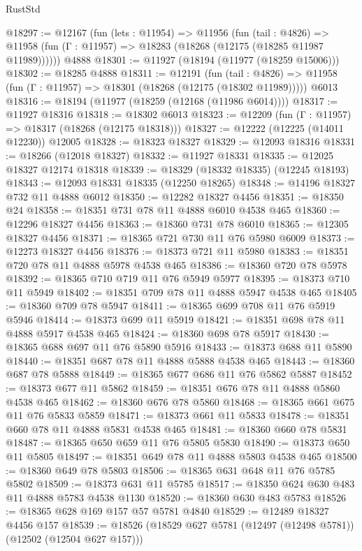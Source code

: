 \begin{lexlean}{RustStd}
\begin{coremodule}
@18297 := @12167
    (fun (lets : @11954) =>
    @11956
      (fun (tail : @4826) =>
      @11958 (fun (Γ : @11957) => @18283 (@18268 (@12175 (@18285 @11987 @11989))))))
    @4888
@18301 := @11927 (@18194 (@11977 (@18259 @15006)))
@18302 := @18285 @4888
@18311 := @12191
    (fun (tail : @4826) => @11958 (fun (Γ : @11957) => @18301 (@18268 (@12175 (@18302 @11989)))))
    @6013
@18316 := @18194 (@11977 (@18259 (@12168 (@11986 @6014))))
@18317 := @11927 @18316
@18318 := @18302 @6013
@18323 := @12209 (fun (Γ : @11957) => @18317 (@18268 (@12175 @18318)))
@18327 := @12222 (@12225 (@14011 @12230)) @12005
@18328 := @18323 @18327
@18329 := @12093 @18316
@18331 := @18266 (@12018 @18327)
@18332 := @11927 @18331
@18335 := @12025 @18327 @12174 @18318
@18339 := @18329 (@18332 @18335) (@12245 @18193)
@18343 := @12093 @18331 @18335 (@12250 @18265)
@18348 := @14196 @18327 @732 @11 @4888 @6012
@18350 := @12282 @18327 @4456
@18351 := @18350 @24
@18358 := @18351 @731 @78 @11 @4888 @6010 @4538 @465
@18360 := @12296 @18327 @4456
@18363 := @18360 @731 @78 @6010
@18365 := @12305 @18327 @4456
@18371 := @18365 @721 @730 @11 @76 @5980 @6009
@18373 := @12273 @18327 @4456
@18376 := @18373 @721 @11 @5980
@18383 := @18351 @720 @78 @11 @4888 @5978 @4538 @465
@18386 := @18360 @720 @78 @5978
@18392 := @18365 @710 @719 @11 @76 @5949 @5977
@18395 := @18373 @710 @11 @5949
@18402 := @18351 @709 @78 @11 @4888 @5947 @4538 @465
@18405 := @18360 @709 @78 @5947
@18411 := @18365 @699 @708 @11 @76 @5919 @5946
@18414 := @18373 @699 @11 @5919
@18421 := @18351 @698 @78 @11 @4888 @5917 @4538 @465
@18424 := @18360 @698 @78 @5917
@18430 := @18365 @688 @697 @11 @76 @5890 @5916
@18433 := @18373 @688 @11 @5890
@18440 := @18351 @687 @78 @11 @4888 @5888 @4538 @465
@18443 := @18360 @687 @78 @5888
@18449 := @18365 @677 @686 @11 @76 @5862 @5887
@18452 := @18373 @677 @11 @5862
@18459 := @18351 @676 @78 @11 @4888 @5860 @4538 @465
@18462 := @18360 @676 @78 @5860
@18468 := @18365 @661 @675 @11 @76 @5833 @5859
@18471 := @18373 @661 @11 @5833
@18478 := @18351 @660 @78 @11 @4888 @5831 @4538 @465
@18481 := @18360 @660 @78 @5831
@18487 := @18365 @650 @659 @11 @76 @5805 @5830
@18490 := @18373 @650 @11 @5805
@18497 := @18351 @649 @78 @11 @4888 @5803 @4538 @465
@18500 := @18360 @649 @78 @5803
@18506 := @18365 @631 @648 @11 @76 @5785 @5802
@18509 := @18373 @631 @11 @5785
@18517 := @18350 @624 @630 @483 @11 @4888 @5783 @4538 @1130
@18520 := @18360 @630 @483 @5783
@18526 := @18365 @628 @169 @157 @57 @5781 @4840
@18529 := @12489 @18327 @4456 @157
@18539 := @18526 (@18529 @627 @5781 (@12497 (@12498 @5781)) (@12502 (@12504 @627 @157)))

\end{coremodule}
\end{lexlean}
